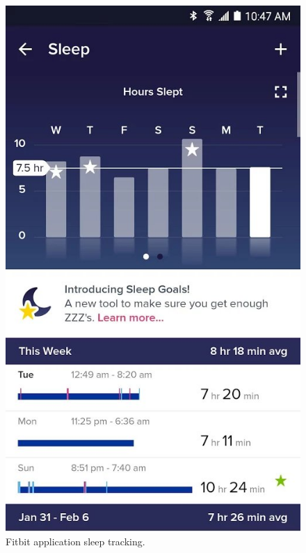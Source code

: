 \begin{figure}[h]
\begin{adjustbox}{width=.4\textwidth,center=\textwidth}
  \centering
  \includegraphics[scale=.5]{images/sleep_tracking.jpg}
\end{adjustbox}
  \caption[Fitbit application sleep tracking]{Fitbit application sleep tracking.\footnotemark}
  \label{fig:google_fit}
\end{figure}


